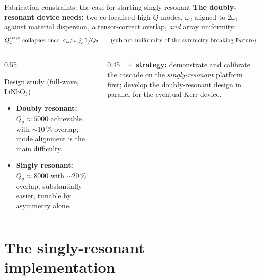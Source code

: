 \documentclass[aspectratio=169,10pt]{beamer}
\begin{document}
\begin{frame}{Fabrication constraints: the case for starting singly-resonant}
  \small
  \textbf{The doubly-resonant device needs:} two co-localised high-$Q$ modes,
  $\omega_2$ aligned to $2\omega_1$ against material dispersion, a tensor-correct
  overlap, \emph{and} array uniformity:
  \[
    Q_2^{\rm array} \;\text{collapses once}\;\; \sigma_\omega/\omega \gtrsim 1/Q_2
    \qquad (\text{sub-nm uniformity of the symmetry-breaking feature}).
  \]
  \begin{columns}[T]
    \begin{column}{0.55\linewidth}
      \begin{block}{Design study (full-wave, LiNbO$_3$)}
        \begin{itemize}\setlength\itemsep{2pt}
          \item \textbf{Doubly resonant:} $Q_2\approx5000$ achievable with
                $\sim$10\,\% overlap; mode alignment is the main difficulty.
          \item \textbf{Singly resonant:} $Q_2\approx8000$ with $\sim$20\,\% overlap;
                substantially easier, tunable by asymmetry alone.
        \end{itemize}
      \end{block}
    \end{column}
    \begin{column}{0.45\linewidth}
      \small
      \vspace{6pt}
      $\Rightarrow$ \textbf{strategy:} demonstrate and calibrate the cascade on the
      \emph{singly-resonant} platform first; develop the doubly-resonant design in
      parallel for the eventual Kerr device.
    \end{column}
  \end{columns}
\end{frame}

\section{The singly-resonant implementation}
\end{document}
